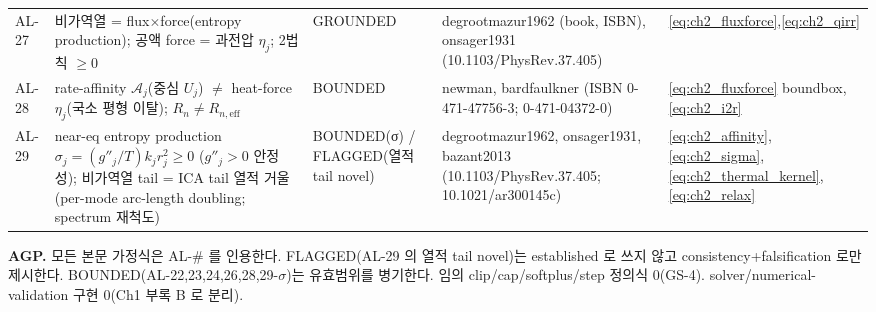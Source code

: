 \documentclass[11pt,a4paper]{article}
\newcommand{\eff}{\mathrm{eff}}
\begin{document}
{\begin{longtable}{p{} p{} p{} p{} p{}}
AL-27 & 비가역열 = flux$\times$force(entropy production); 공액 force = 과전압 $\eta_j$; 2법칙 $\ge0$ & GROUNDED & degrootmazur1962 (book, ISBN), onsager1931 (10.1103/PhysRev.37.405) & \eqref{eq:ch2_fluxforce},\eqref{eq:ch2_qirr} \\
AL-28 & rate-affinity $\mathcal A_j$(중심 $U_j$) $\ne$ heat-force $\eta_j$(국소 평형 이탈); $R_n\ne R_{n,\eff}$ & BOUNDED & newman, bardfaulkner (ISBN 0-471-47756-3; 0-471-04372-0) & \eqref{eq:ch2_fluxforce} boundbox,\eqref{eq:ch2_i2r} \\
AL-29 & near-eq entropy production $\sigma_j=(g''_j/T)k_j r_j^2\ge0$ ($g''_j>0$ 안정성); 비가역열 tail = ICA tail 열적 거울 (per-mode arc-length doubling; spectrum 재척도) & BOUNDED(σ) / FLAGGED(열적 tail novel) & degrootmazur1962, onsager1931, bazant2013 (10.1103/PhysRev.37.405; 10.1021/ar300145c) & \eqref{eq:ch2_affinity},\eqref{eq:ch2_sigma},\eqref{eq:ch2_thermal_kernel},\eqref{eq:ch2_relax} \\
\bottomrule
\end{longtable}
}
\textbf{AGP.} 모든 본문 가정식은 AL-\# 를 인용한다. FLAGGED(AL-29 의 열적 tail novel)는 established 로 쓰지
않고 consistency+falsification 로만 제시한다. BOUNDED(AL-22,23,24,26,28,29-$\sigma$)는 유효범위를 병기한다.
임의 clip/cap/softplus/step 정의식 0(GS-4). solver/numerical-validation 구현 0(Ch1 부록 B 로 분리).

\end{document}
